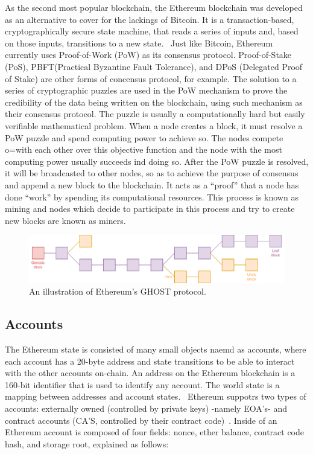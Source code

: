     As the second most popular blockchain, the Ethereum blockchain was developed as an alternative to cover for the lackings of Bitcoin.
    It is a transaction-based, cryptographically secure state machine, that reads a series of inputs and, based on those inputs, transitions to a new state.~\cite{ferreira2022smart}
    Just like Bitcoin, Ethereum currently uses Proof-of-Work (PoW) as its consensus protocol.
    Proof-of-Stake (PoS), PBFT(Practical Byzantine Fault Tolerance), and DPoS (Delegated Proof of Stake) are other forms of concensus protocol, for example.
    The solution to a series of cryptographic puzzles are used in the PoW mechanism to prove the credibility of the data being written on the blockchain, using such mechanism as their consensus protocol.
    The puzzle is usually a computationally hard but easily verifiable mathematical problem.
    When a node creates a block, it must resolve a PoW puzzle and spend computing power to achieve so. The nodes compete o=with each other over this objective function and the node with the most computing power usually succeeds ind doing so.
    After the PoW puzzle is resolved, it will be broadcasted to other nodes, so as to achieve the purpose of consensus and append a new block to the blockchain.
    It acts as a “proof” that a node has done “work” by spending its computational resources.
    This process is known as mining and nodes which decide to participate in this process and try to create new blocks are known as miners.

    \begin{figure}
        \centering
        \includegraphics[width=\textwidth]{figures/uncle.png}
        \caption{An illustration of Ethereum's GHOST protocol.}
        \label{fig:uncle}
    \end{figure}

    \subsection{Accounts}
        The Ethereum state is consisted of many small objects naemd as accounts, where each account has a 20-byte address and state transitions to be able to interact with the other accounts on-chain.
        An address on the Ethereum blockchain is a 160-bit identifier that is used to identify any account.
        The world state is a mapping between addresses and account states.~\cite{wood2014ethereum}
        Ethereum suppotrs two types of accounts: externally owned
        (controlled by private keys) -namely EOA's- and contract accounts (CA'S, controlled by their contract code)~\cite{ethereum2014ethereum}.
        Inside of an Ethereum account is composed of four fields: nonce, ether balance, contract code hash, and storage root, explained as follows:

